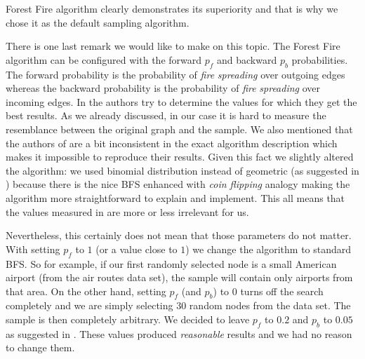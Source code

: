 Forest Fire algorithm clearly demonstrates its superiority and that is why we chose it as the default sampling algorithm.

There is one last remark we would like to make on this topic. The Forest Fire algorithm can be configured with the forward $p_f$ and backward $p_b$ probabilities. The forward probability is the probability of \emph{fire} \emph{spreading} over outgoing edges whereas the backward probability is the probability of \emph{fire} \emph{spreading} over incoming edges. In \cite{leskovec2006sampling} the authors try to determine the values for which they get the best results. As we already discussed, in our case it is hard to measure the resemblance between the original graph and the sample. We also mentioned that the authors of \cite{leskovec2006sampling} are a bit inconsistent in the exact algorithm description which makes it impossible to reproduce their results. Given this fact we slightly altered the algorithm: we used binomial distribution instead of geometric (as suggested in \cite{leskovec2005graphs}) because there is the nice BFS enhanced with \emph{coin flipping} analogy making the algorithm more straightforward to explain and implement. This all means that the values measured in \cite{leskovec2006sampling} are more or less irrelevant for us.

Nevertheless, this certainly does not mean that those parameters do not matter. With setting $p_f$ to $1$ (or a value close to $1$) we change the algorithm to standard BFS. So for example, if our first randomly selected node is a small American airport (from the air routes data set), the sample will contain only airports from that area. On the other hand, setting $p_f$ (and $p_b$) to $0$ turns off the search completely and we are simply selecting 30 random nodes from the data set. The sample is then completely arbitrary. We decided to leave $p_f$ to $0.2$ and $p_b$ to $0.05$ as suggested in  \cite{leskovec2006sampling}. These values produced \emph{reasonable} results and we had no reason to change them.
